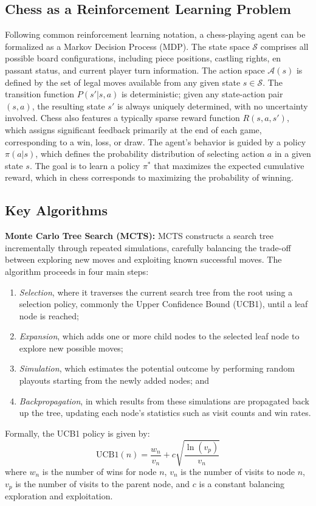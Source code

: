 \documentclass[journal, a4paper]{IEEEtran}
\begin{document}
\subsection{Chess as a Reinforcement Learning Problem}
\noindent Following common reinforcement learning notation, a chess-playing agent can be formalized as a Markov Decision Process (MDP). The state space $\mathcal{S}$ comprises all possible board configurations, including piece positions, castling rights, en passant status, and current player turn information. The action space $\mathcal{A}(s)$ is defined by the set of legal moves available from any given state \( s \in \mathcal{S} \). The transition function $P(s'|s,a)$ is deterministic; given any state-action pair $(s, a)$, the resulting state $s'$ is always uniquely determined, with no uncertainty involved. Chess also features a typically sparse reward function $R(s, a, s')$, which assigns significant feedback primarily at the end of each game, corresponding to a win, loss, or draw. The agent’s behavior is guided by a policy $\pi(a|s)$, which defines the probability distribution of selecting action $a$ in a given state $s$. The goal is to learn a policy $\pi^*$ that maximizes the expected cumulative reward, which in chess corresponds to maximizing the probability of winning.


\subsection{Key Algorithms}
\noindent \textbf{Monte Carlo Tree Search (MCTS): } 
MCTS constructs a search tree incrementally through repeated simulations, carefully balancing the trade-off between exploring new moves and exploiting known successful moves. The algorithm proceeds in four main steps: 
\begin{enumerate}
    \item \textit{Selection}, where it traverses the current search tree from the root using a selection policy, commonly the Upper Confidence Bound (UCB1), until a leaf node is reached;
    \item \textit{Expansion}, which adds one or more child nodes to the selected leaf node to explore new possible moves;
    \item \textit{Simulation}, which estimates the potential outcome by performing random playouts starting from the newly added nodes; and
    \item \textit{Backpropagation}, in which results from these simulations are propagated back up the tree, updating each node’s statistics such as visit counts and win rates.
\end{enumerate}
Formally, the UCB1 policy is given by:
\[
\text{UCB1}(n) = \frac{w_n}{v_n} + c \sqrt{\frac{\ln(v_p)}{v_n}}
\]
where \(w_n\) is the number of wins for node \(n\), \(v_n\) is the number of visits to node \(n\), \(v_p\) is the number of visits to the parent node, and \(c\) is a constant balancing exploration and exploitation.
\end{document}
